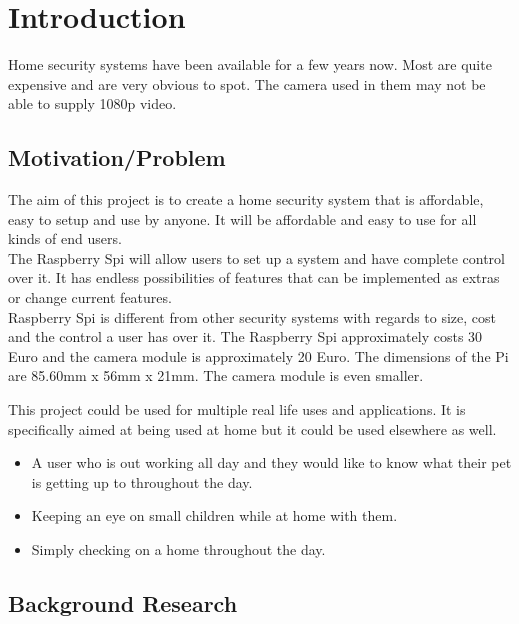 \documentclass[]{report}
\begin{document}
\tableofcontents
\chapter{Introduction}
\label{ch:intro} 

Home security systems have been available for a few years now. Most are quite expensive and are very obvious to spot. The camera used in them may not be able to supply 1080p video.

\section{Motivation/Problem}
\label{sec:motprob}
The aim of this project is to create a home security system that is affordable, easy to setup and use by anyone. It will be affordable and easy to use for all kinds of end users.\\

The Raspberry Spi will allow users to set up a system and have complete control over it. It has endless possibilities of features that can be implemented as extras or change current features.\\

Raspberry Spi is different from other security systems with regards to size, cost and the control a user has over it. The Raspberry Spi approximately costs 30 Euro and the camera module is approximately 20 Euro. The dimensions of the Pi are 85.60mm x 56mm x 21mm. The camera module is even smaller.

This project could be used for multiple real life uses and applications. It is specifically aimed at being used at home but it could be used elsewhere as well.

\begin{itemize}
  \item A user who is out working all day and they would like to know what their pet is getting up to throughout the day.\\
  \item Keeping an eye on small children while at home with them.\\
  \item Simply checking on a home throughout the day.\\
\end{itemize}
% 
\section{Background Research}
\label{sec:research}
\end{document}
